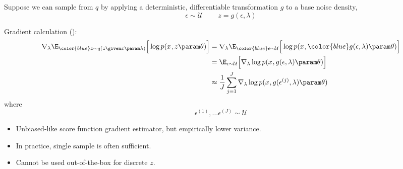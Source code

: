 \begin{frame}
     
    Suppose we can sample from $q$ by applying a deterministic, differentiable transformation $g$ to a base noise density, 
\[ \epsilon \sim \mathcal{U} \,\,\,\,\,\,\,\,\,\,\,\,\, z = g(\epsilon, \lambda) \]
    \pause 
    
Gradient calculation ():
\begin{align*}
     \nabla_\lambda \E_{{\color{blue} z\sim q(z\given x \param \lambda)}}\Big[ \log p(x^{}, z \param \theta )\Big] &= \nabla_\lambda \E_{{\color{blue} \epsilon \sim \mathcal{U}}}\Big[ \log p(x^{}, {\color{blue} g(\epsilon,\lambda) \param \theta) }\Big] \\
    &=  \E_{{ \epsilon \sim \mathcal{U}}}\Big[\nabla_\lambda \log {p(x^{}, { g(\epsilon,\lambda)} \param \theta) }\Big] \\
    &\approx \frac{1}{J} \sum_{j=1}^J\nabla_\lambda \log {p(x^{}, { g(\epsilon^{(j)},\lambda)} \param \theta) }
\end{align*}
where
\[ \epsilon^{(1)}, \dots \epsilon^{(J)} \sim \mathcal{U}\]
\end{frame}


\begin{frame}
\center
\begin{itemize}
    \item Unbiased-like score function gradient estimator, but empirically lower variance.
    \item In practice, single sample is often sufficient.
    \item Cannot be used out-of-the-box for discrete $z$.
\end{itemize}
\end{frame}


